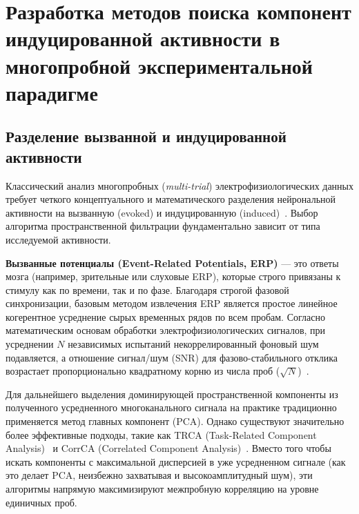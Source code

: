 \chapter{Разработка методов поиска компонент индуцированной активности в многопробной экспериментальной парадигме}
\label{ch:multi_trial_methods}

\section{Разделение вызванной и индуцированной активности}
\label{sec:erp_vs_erd}

Классический анализ многопробных (\textit{multi-trial}) электрофизиологических данных требует четкого концептуального и математического разделения нейрональной активности на вызванную (evoked) и индуцированную (induced)~\cite{tallon1999oscillatory, pfurtscheller1999event, buzsaki2006rhythms}. Выбор алгоритма пространственной фильтрации фундаментально зависит от типа исследуемой активности.

\textbf{Вызванные потенциалы (Event-Related Potentials, ERP)} --- это ответы мозга (например, зрительные или слуховые ERP), которые строго привязаны к стимулу как по времени, так и по фазе. Благодаря строгой фазовой синхронизации, базовым методом извлечения ERP является простое линейное когерентное усреднение сырых временных рядов по всем пробам. Согласно математическим основам обработки электрофизиологических сигналов, при усреднении $N$ независимых испытаний некоррелированный фоновый шум подавляется, а отношение сигнал/шум (SNR) для фазово-стабильного отклика возрастает пропорционально квадратному корню из числа проб ($\sqrt{N}$)~\cite{hari2023meg}. 

Для дальнейшего выделения доминирующей пространственной компоненты из полученного усредненного многоканального сигнала на практике традиционно применяется метод главных компонент (PCA). Однако существуют значительно более эффективные подходы, такие как TRCA (Task-Related Component Analysis)~\cite{tanaka2013trca} и CorrCA (Correlated Component Analysis)~\cite{parra2019corrca, zhang2018corrca}. Вместо того чтобы искать компоненты с максимальной дисперсией в уже усредненном сигнале (как это делает PCA, неизбежно захватывая и высокоамплитудный шум), эти алгоритмы напрямую максимизируют межпробную корреляцию на уровне единичных проб. 

